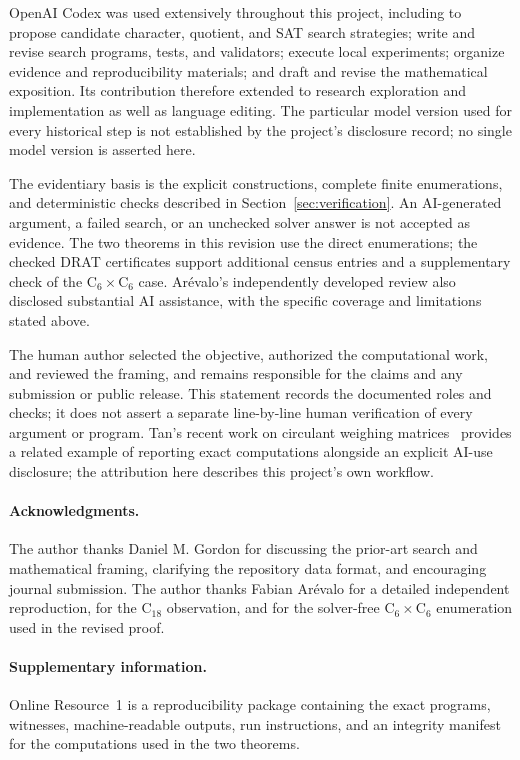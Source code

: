 \documentclass[11pt]{article}
\theoremstyle{remark}
\newcommand{\C}{\mathrm{C}}
\begin{document}
OpenAI Codex was used extensively throughout this project, including to
propose candidate character, quotient, and SAT search strategies; write and
revise search programs, tests, and validators; execute local experiments;
organize evidence and reproducibility materials; and draft and revise the
mathematical exposition.  Its contribution therefore extended to research
exploration and implementation as well as language editing.  The particular
model version used for every historical step is not established by the
project's disclosure record; no single model version is asserted here.

The evidentiary basis is the explicit constructions, complete finite
enumerations, and deterministic checks described in
Section~\ref{sec:verification}.  An AI-generated argument, a failed search,
or an unchecked solver answer is not accepted as evidence.  The two
theorems in this revision use the direct enumerations; the checked DRAT
certificates support additional census entries and a supplementary check
of the $\C_6\times\C_6$ case.  Ar\'evalo's independently developed review
also disclosed substantial AI assistance, with the specific coverage and
limitations stated above.

The human author selected the objective, authorized the computational work,
and reviewed the framing, and remains responsible for the claims and any
submission or public release.  This statement records the documented roles
and checks; it does not assert a separate line-by-line human verification
of every argument or program.  Tan's recent work on circulant weighing
matrices~\cite{tan} provides a related example of reporting exact
computations alongside an explicit AI-use disclosure; the attribution here
describes this project's own workflow.

\paragraph{Acknowledgments.}
The author thanks Daniel M. Gordon for discussing the prior-art search and
mathematical framing, clarifying the repository data format, and encouraging
journal submission.  The author thanks Fabian Ar\'evalo for a detailed
independent reproduction, for the $\C_{18}$ observation, and for the
solver-free $\C_6\times\C_6$ enumeration used in the revised proof.

\paragraph{Supplementary information.}
Online Resource~1 is a reproducibility package containing the exact programs,
witnesses, machine-readable outputs, run instructions, and an integrity
manifest for the computations used in the two theorems.
\end{document}
